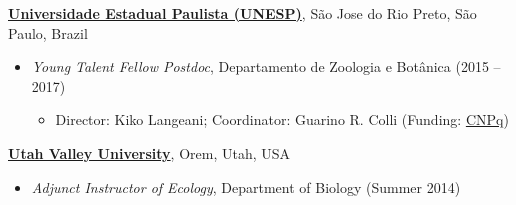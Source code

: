 \documentclass[margin,line]{res}
\begin{document}
\begin{resume}
{\bf \href{https://www2.unesp.br/}{Universidade Estadual Paulista (UNESP)}}, S\~{a}o Jose do Rio Preto, S\~{a}o Paulo, Brazil
\begin{itemize}
	\item[] \hspace*{-2mm} \textit{Young Talent Fellow Postdoc}, Departamento de Zoologia e Bot\^{a}nica  (2015 -- 2017)
\begin{itemize}
	\item Director: Kiko Langeani; Coordinator: Guarino R. Colli (Funding: \href{http://www.cnpq.br/}{CNPq})
\end{itemize}
\end{itemize}
\vspace*{-.1in}
{\bf \href{https://www.uvu.edu}{Utah Valley University}}, Orem, Utah, USA
\begin{itemize}
	\item[] \hspace*{-2mm} \textit{Adjunct Instructor of Ecology}, Department of Biology  (Summer 2014)
\end{itemize}




\end{resume}
\end{document}
